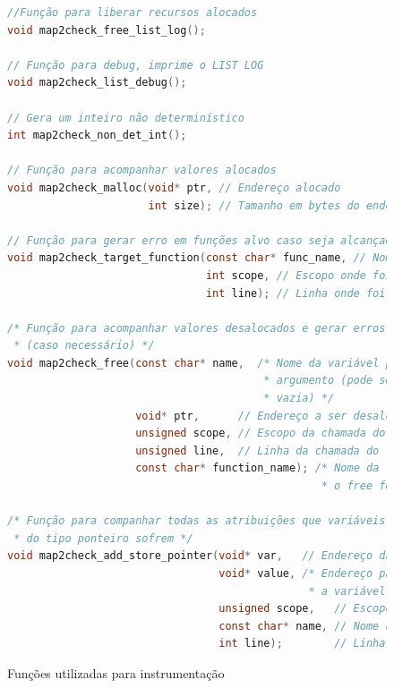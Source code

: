\begin{figure}[htb]
\caption{\label{fig:progHeaderFunctions} Funções utilizadas para instrumentação}
\begin{center}

\begin{lstlisting}[language=C]    
//Função para liberar recursos alocados 
void map2check_free_list_log(); 

// Função para debug, imprime o LIST LOG
void map2check_list_debug(); 

// Gera um inteiro não determinístico
int map2check_non_det_int(); 

// Função para acompanhar valores alocados
void map2check_malloc(void* ptr, // Endereço alocado
                      int size); // Tamanho em bytes do endereço

// Função para gerar erro em funções alvo caso seja alcançado           
void map2check_target_function(const char* func_name, // Nome da função
                               int scope, // Escopo onde foi alcançada
                               int line); // Linha onde foi alcançada

/* Função para acompanhar valores desalocados e gerar erros
 * (caso necessário) */                         
void map2check_free(const char* name,  /* Nome da variável passada como 
                                        * argumento (pode ser uma string 
                                        * vazia) */
                    void* ptr,      // Endereço a ser desalocado
                    unsigned scope, // Escopo da chamada do free
                    unsigned line,  // Linha da chamada do free
                    const char* function_name); /* Nome da função onde
                                                 * o free foi chamado */

/* Função para companhar todas as atribuições que variáveis 
 * do tipo ponteiro sofrem */                   
void map2check_add_store_pointer(void* var,   // Endereço da variável
                                 void* value, /* Endereço para onde 
                                               * a variável aponta */
                                 unsigned scope,   // Escopo da atribuição
                                 const char* name, // Nome da variável
                                 int line);        // Linha da atribuição
\end{lstlisting}
\end{center}
\end{figure}



